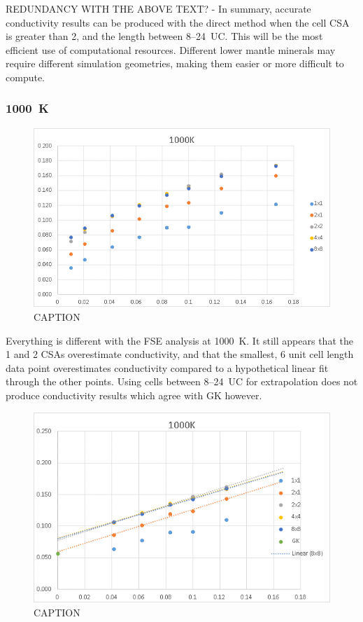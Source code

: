 REDUNDANCY WITH THE ABOVE TEXT? - In summary, accurate \bdgs conductivity results can be produced with the direct method when the cell CSA is greater than 2, and the length between 8--24~UC. This will be the most efficient use of computational resources. Different lower mantle minerals may require different simulation geometries, making them easier or more difficult to compute.



\subsubsection{1000~K}

\begin{figure}[h!]
\includegraphics[width=\linewidth]{Figures/direct_inv_1000.png}
\caption[direct inv 1000]{CAPTION}
\label{fig:direct_inv_1000}
\end{figure}

Everything is different with the FSE analysis at 1000~K. It still appears that the 1 and 2 CSAs overestimate conductivity, and that the smallest, 6 unit cell length data point overestimates conductivity compared to a hypothetical linear fit through the other points. Using cells between 8--24~UC for extrapolation does not produce conductivity results which agree with GK however. 

\begin{figure}[h!]
\includegraphics[width=\linewidth]{Figures/direct_inv_cut-up_1000_03.png}
\caption[direct inv cutup 1000 03]{CAPTION}
\label{fig:direct_inv_cutup_1000_03}
\end{figure}

